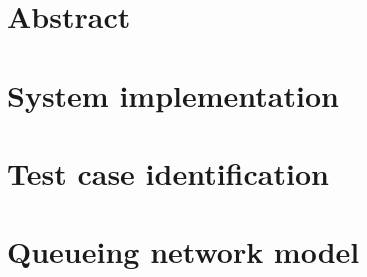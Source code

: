 \documentclass[12pt, twoside]{report}
\begin{document}
	\tableofcontents
	\listoftables
	\listoffigures

	\chapter*{Abstract}
	

	\chapter{System implementation}
	\setcounter{page}{1}
	

	\chapter{Test case identification}
	

	\chapter{Queueing network model}
	

\end{document}
